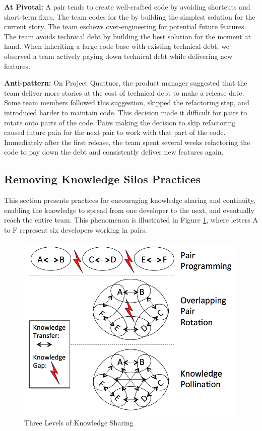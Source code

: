 \textbf{At Pivotal:} A pair tends to create well-crafted code by avoiding shortcuts and short-term fixes. The team codes for the  by building the simplest solution for the current story. The team eschews over-engineering for potential future features. The team avoids technical debt by building the best solution for the moment at hand. When inheriting a large code base with existing technical debt, we observed a team actively paying down technical debt while delivering new features. 

\textbf{Anti-pattern:} On Project Quattuor, the product manager suggested that the team deliver more stories at the cost of technical debt to make a release date. Some team members followed this suggestion, skipped the refactoring step, and introduced harder to maintain code. This decision made it difficult for pairs to rotate onto parts of the code. Pairs making the decision to skip refactoring caused future pain for the next pair to work with that part of the code. Immediately after the first release, the team spent several weeks refactoring the code to pay down the debt and consistently deliver new features again.
\subsection{Removing Knowledge Silos Practices}
This section presents practices for encouraging knowledge sharing and continuity, enabling the knowledge to spread from one developer to the next, and eventually reach the entire team. This phenomenon is illustrated in Figure \ref{KnowledgeSharing}, where letters A to F represent six developers working in pairs.

\begin{figure}[t]
\centering
\includegraphics[width=\oneColumnWidth{}]{sustainable_software_development_images/KnowledgeSharingLevels.png}
\caption{Three Levels of Knowledge Sharing}
\label{KnowledgeSharing}
\end{figure}

